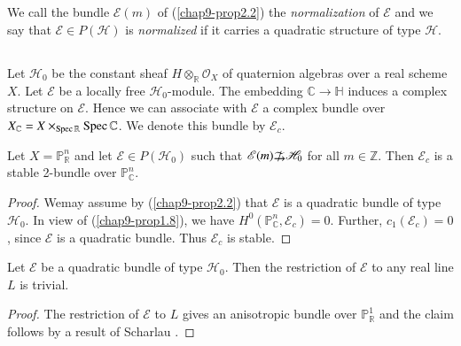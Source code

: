 \setcounter{subsection}{3}
\subsection{}\label{chap9-sec2.4}
We call the bundle $\mathscr{E}(m)$ of (\ref{chap9-prop2.2}) the {\em
normalization} of $\mathscr{E}$ and we say that $\mathscr{E}\in
P(\mathscr{H})$ is {\em normalized} if it carries a quadratic
structure of type $\mathscr{H}$. 

\subsection{}\label{chap9-sec2.5}

Let $\mathscr{H}_{0}$ be the constant sheaf
$H\otimes_{\mathbb{R}}\mathscr{O}_{X}$ of quaternion algebras over a
real scheme $X$. Let $\mathscr{E}$ be a locally free
$\mathscr{H}_{0}$-module. The embedding $\mathbb{C}\to \mathbb{H}$
induces a complex structure on $\mathscr{E}$. Hence we can associate
with $\mathscr{E}$ a complex bundle over
$X_{\mathbb{C}}=X\times_{\operatorname{Spec} \mathbb{R}}\operatorname{Spec} \mathbb{C}$. We denote
this bundle by $\mathscr{E}_{c}$. 

\setcounter{subprop}{5}
\begin{subprop}\label{chap9-prop2.6}
Let $X=\mathbb{P}^{n}_{\mathbb{R}}$ and let $\mathscr{E}\in
P(\mathscr{H}_{0})$ such that $\mathscr{E}(m)\; / \kern
-7pt \raisebox{-2pt}{{$\widetilde{\rightarrow}$}}\mathscr{H}_{0}$ for
all $m\in \mathbb{Z}$. Then $\mathscr{E}_{c}$ is a stable 2-bundle
over $\mathbb{P}^{n}_{\mathbb{C}}$.
\end{subprop}

\begin{proof}
We\pageoriginale may assume by (\ref{chap9-prop2.2}) that
$\mathscr{E}$ is a quadratic bundle of type $\mathscr{H}_{0}$. In view
of (\ref{chap9-prop1.8}), we have
$H^{0}(\mathbb{P}^{n}_{\mathbb{C}},\mathscr{E}_{c})=0$. Further,
$c_{1}(\mathscr{E}_{c})=0$, since $\mathscr{E}$ is a quadratic
bundle. Thus $\mathscr{E}_{c}$ is stable.
\end{proof}

\begin{subprop}\label{chap9-prop2.7}
Let $\mathscr{E}$ be a quadratic bundle of type
$\mathscr{H}_{0}$. Then the restriction of $\mathscr{E}$ to any real
line $L$ is trivial.
\end{subprop}

\begin{proof}
The restriction of $\mathscr{E}$ to $L$ gives an anisotropic bundle
over $\mathbb{P}^{1}_{\mathbb{R}}$ and the claim follows by a result
of Scharlau \cite{chap9-key14}. 
\end{proof}

